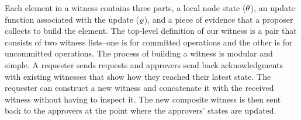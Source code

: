 Each element in a witness contains three parts, a local node state ($\theta$), an update function associated with the update ($\varrho$), and a piece of evidence that a proposer collects to build the element. 
The top-level definition of our witness is a pair that consists of two witness lists--one is for committed operations and the other is for uncommitted operations.
The process of building a witness is modular and simple. A requester sends
requests and approvers send back acknowledgments with existing witnesses that
show how they reached their latest state.
The requester can construct a new witness and concatenate it with the
received witness without having to inspect it.
The new composite witness is then sent back to the approvers at the point where
 the approvers' states are updated.


%
%
%
%
%
%
%

